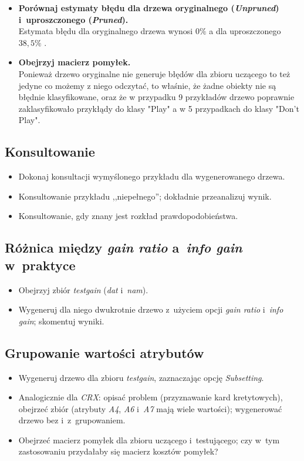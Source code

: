 \documentclass{article}
\begin{document}
\begin{itemize}
\item \textbf{Porównaj estymaty błędu dla drzewa oryginalnego (\emph{Unpruned}) i~uproszczonego (\emph{Pruned}).}
	\\Estymata błędu dla oryginalnego drzewa wynosi  $ 0\% $ a dla uproszczonego $ 38,5\% $ .

\item \textbf{Obejrzyj macierz pomyłek.}
	\\Ponieważ drzewo oryginalne nie generuje błędów dla zbioru uczącego to też jedyne co możemy z niego odczytać, to właśnie, że żadne obiekty nie są błędnie klasyfikowane, oraz że w przypadku 9 przykładów drzewo poprawnie zaklasyfikowało przykłądy do klasy "Play" a w 5 przypadkach do klasy "Don't Play".

\end{itemize}

\subsection{Konsultowanie}

\begin{itemize}
\item Dokonaj konsultacji wymyślonego przykładu dla wygenerowanego drzewa.
\item Konsultowanie przykładu ,,niepełnego''; dokładnie przeanalizuj wynik.
\item Konsultowanie, gdy znany jest rozkład prawdopodobieństwa.
\end{itemize}

\subsection{Różnica między \emph{gain ratio} a~\emph{info gain} w~praktyce}

\begin{itemize}
\item Obejrzyj zbiór \emph{testgain} (\emph{dat} i~\emph{nam}).
\item Wygeneruj dla niego dwukrotnie drzewo z~użyciem opcji \emph{gain ratio} i~\emph{info gain}; skomentuj wyniki.
\end{itemize}

\subsection{Grupowanie wartości atrybutów}

\begin{itemize}
\item Wygeneruj drzewo dla zbioru \emph{testgain}, zaznaczając opcję \emph{Subsetting}.
\item Analogicznie dla \emph{CRX}: opisać problem (przyznawanie kard kretytowych), obejrzeć zbiór (atrybuty \emph{A4}, \emph{A6} i~\emph{A7} mają wiele wartości); wygenerować drzewo bez i~z~grupowaniem.
\item Obejrzeć macierz pomyłek dla zbioru uczącego i~testującego; czy w~tym zastosowaniu przydałaby się macierz kosztów pomyłek?
\end{itemize}
\end{document}
